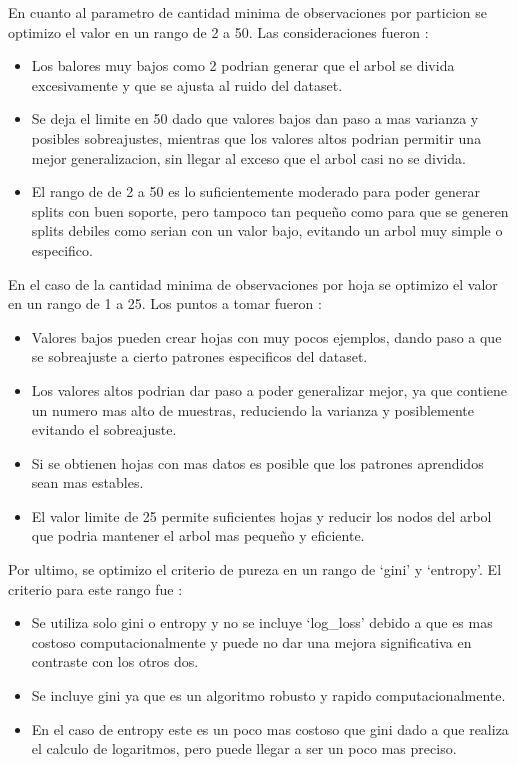 \documentclass[12pt,a4paper]{article}
\begin{document}
En cuanto al parametro de cantidad minima de observaciones por particion se optimizo el valor en un rango de 2 a 50.
Las consideraciones fueron \autocite{mDecisionTreesSplit2024,gibbinsVisualGuideTuning2025}:
\begin{itemize}
  \item Los balores muy bajos como 2 podrian generar que el arbol se divida excesivamente y que se ajusta al ruido del dataset.
  \item Se deja el limite en 50 dado que valores bajos dan paso a mas varianza y posibles sobreajustes,
    mientras que los valores altos podrian permitir una mejor generalizacion, sin llegar al exceso
    que el arbol casi no se divida.
  \item El rango de de 2 a 50 es lo suficientemente moderado para poder generar splits con buen soporte,
    pero tampoco tan pequeño como para que se generen splits debiles como serian con un valor bajo, evitando un arbol muy simple o especifico.
\end{itemize}

En el caso de la cantidad minima de observaciones por hoja se optimizo el valor en un rango de 1 a 25.
Los puntos a tomar fueron \autocite{ConfigureDecisionTreeClassifierMin_samples_leaf,wijayaNBDLite42023}:
\begin{itemize}
  \item Valores bajos pueden crear hojas con muy pocos ejemplos, dando paso a que se
    sobreajuste a cierto patrones especificos del dataset.
  \item Los valores altos podrian dar paso a poder generalizar mejor, ya que contiene un numero
    mas alto de muestras, reduciendo la varianza y posiblemente evitando el sobreajuste.
  \item Si se obtienen hojas con mas datos es posible que los patrones aprendidos sean mas estables.
  \item El valor limite de 25 permite suficientes hojas y reducir los nodos del arbol que podria
    mantener el arbol mas pequeño y eficiente.
\end{itemize}

Por ultimo, se optimizo el criterio de pureza en un rango de `gini' y `entropy'.
El criterio para este rango fue \autocite{raschkaWhyAreWe0000,aznarDecisionTreesGini2020}:
\begin{itemize}
  \item Se utiliza solo gini o entropy y no se incluye `log_loss' debido a que es mas costoso computacionalmente y puede no dar una
    mejora significativa en contraste con los otros dos.
  \item Se incluye gini ya que es un algoritmo robusto y rapido computacionalmente.
  \item En el caso de entropy este es un poco mas costoso que gini dado a que realiza el calculo de logaritmos, pero puede
    llegar a ser un poco mas preciso.
\end{itemize}
\end{document}

